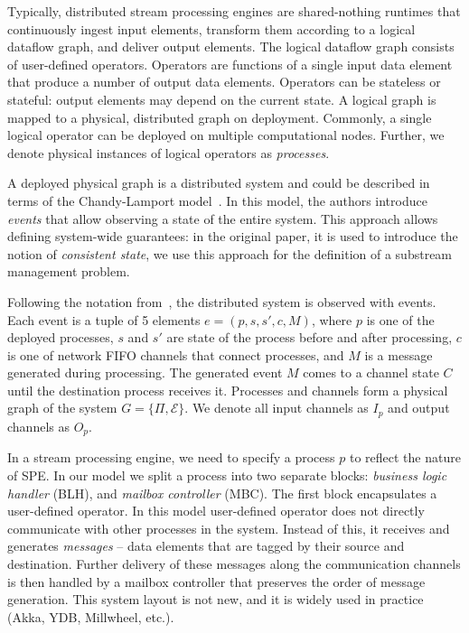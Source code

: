Typically, distributed stream processing engines are shared-nothing runtimes that continuously ingest input elements, transform them according to a logical dataflow graph, and deliver output elements. The logical dataflow graph consists of user-defined operators. Operators are functions of a single input data element that produce a number of output data elements. Operators can be stateless or stateful: output elements may depend on the current state. A logical graph is mapped to a physical, distributed graph on deployment. Commonly, a single logical operator can be deployed on multiple computational nodes. Further, we denote physical instances of logical operators as {\em processes}.

A deployed physical graph is a distributed system and could be described in terms of the Chandy-Lamport model~\cite{Chandy:1985:DSD:214451.214456, carbone2018scalable}. In this model, the authors introduce \textit{events} that allow observing a state of the entire system. This approach allows defining system-wide guarantees: in the original paper, it is used to introduce the notion of {\em consistent state}, we use this approach for the definition of a substream management problem.

Following the notation from~\cite{Chandy:1985:DSD:214451.214456, carbone2018scalable}, the distributed system is observed with events. Each event is a tuple of 5 elements $e = (p, s, s', c, M)$, where $p$ is one of the deployed processes, $s$ and $s'$ are state of the process before and after processing, $c$ is one of network FIFO channels that connect processes, and $M$ is a message generated during processing. The generated event $M$ comes to a channel state $C$ until the destination process receives it. Processes and channels form a physical graph of the system $G=\{\Pi,\mathcal{E}\}$. We denote all input channels as $I_p$ and output channels as $O_p$.

In a stream processing engine, we need to specify a process $p$ to reflect the nature of SPE. In our model we split a process into two separate blocks: {\em business logic handler} (BLH), and {\em mailbox controller} (MBC). The first block encapsulates a user-defined operator. In this model user-defined operator does not directly communicate with other processes in the system. Instead of this, it receives and generates {\em messages} -- data elements that are tagged by their source and destination. Further delivery of these messages along the communication channels is then handled by a mailbox controller that preserves the order of message generation. This system layout is not new, and it is widely used in practice (Akka, YDB, Millwheel, etc.).

